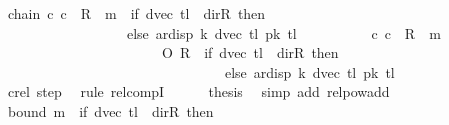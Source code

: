 \begin{isabellebody}
\ chain{\isacharcolon}{\kern0pt}\ {\isachardoublequoteopen}{\isacharparenleft}{\kern0pt}c{}{\isacharcomma}{\kern0pt}\ c{}{\isacharparenright}{\kern0pt}\ {\isasymin}\ R{\isacharprime}{\kern0pt}\ {\isacharcircum}{\kern0pt}{\isacharcircum}{\kern0pt}\ {\isacharparenleft}{\kern0pt}m{}\ {\isacharplus}{\kern0pt}\ {\isacharparenleft}{\kern0pt}if\ dvec\ {\isacharquery}{\kern0pt}tl\ {\isacharequal}{\kern0pt}\ dir{\isachardot}{\kern0pt}R\ then\ {}\isanewline
\ \ \ \ \ \ \ \ \ \ \ \ \ \ \ \ \ \ else\ ar{\isacharunderscore}{\kern0pt}disp\ {\isacharquery}{\kern0pt}k\ {\isacharparenleft}{\kern0pt}dvec\ {\isacharquery}{\kern0pt}tl{\isacharparenright}{\kern0pt}\ {\isacharparenleft}{\kern0pt}{\isacharquery}{\kern0pt}pk\ {\isacharquery}{\kern0pt}tl{\isacharparenright}{\kern0pt}{\isacharparenright}{\kern0pt}{\isacharparenright}{\kern0pt}{\isachardoublequoteclose}\isanewline
\ \ \isamarkupfalse%
\ {\isacharminus}{\kern0pt}\isanewline
\ \ \ \ \isamarkupfalse%
\ {\isachardoublequoteopen}{\isacharparenleft}{\kern0pt}c{}{\isacharcomma}{\kern0pt}\ c{}{\isacharparenright}{\kern0pt}\ {\isasymin}\ R{\isacharprime}{\kern0pt}\ {\isacharcircum}{\kern0pt}{\isacharcircum}{\kern0pt}\ m{}\isanewline
\ \ \ \ \ \ \ \ \ \ \ \ \ \ \ \ \ \ \ \ \ \ \ O\ R{\isacharprime}{\kern0pt}\ {\isacharcircum}{\kern0pt}{\isacharcircum}{\kern0pt}\ {\isacharparenleft}{\kern0pt}if\ dvec\ {\isacharquery}{\kern0pt}tl\ {\isacharequal}{\kern0pt}\ dir{\isachardot}{\kern0pt}R\ then\ {}\isanewline
\ \ \ \ \ \ \ \ \ \ \ \ \ \ \ \ \ \ \ \ \ \ \ \ \ \ \ \ \ \ \ \ else\ ar{\isacharunderscore}{\kern0pt}disp\ {\isacharquery}{\kern0pt}k\ {\isacharparenleft}{\kern0pt}dvec\ {\isacharquery}{\kern0pt}tl{\isacharparenright}{\kern0pt}\ {\isacharparenleft}{\kern0pt}{\isacharquery}{\kern0pt}pk\ {\isacharquery}{\kern0pt}tl{\isacharparenright}{\kern0pt}{\isacharparenright}{\kern0pt}{\isachardoublequoteclose}\isanewline
\ \ \ \ \ \ \isamarkupfalse%
\ c{}{\isacharunderscore}{\kern0pt}rel\ step\ \isamarkupfalse%
\ {\isacharparenleft}{\kern0pt}rule\ relcompI{\isacharparenright}{\kern0pt}\isanewline
\ \ \ \ \isamarkupfalse%
\ {\isacharquery}{\kern0pt}thesis\ \isamarkupfalse%
\ {\isacharparenleft}{\kern0pt}simp\ add{\isacharcolon}{\kern0pt}\ relpow{\isacharunderscore}{\kern0pt}add{\isacharparenright}{\kern0pt}\isanewline
\ \ \isamarkupfalse%
\isanewline
\ \ \isamarkupfalse%
\ bound{\isacharcolon}{\kern0pt}\ {\isachardoublequoteopen}m{}\ {\isacharplus}{\kern0pt}\ {\isacharparenleft}{\kern0pt}if\ dvec\ {\isacharquery}{\kern0pt}tl\ {\isacharequal}{\kern0pt}\ dir{\isachardot}{\kern0pt}R\ then\ {}\isanewline

\end{isabellebody}

